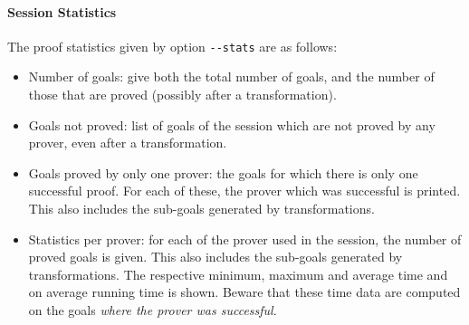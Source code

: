 
\paragraph{Session Statistics}

The proof statistics given by option \verb|--stats| are as follows:
\begin{itemize}
\item Number of goals: give both the total number of goals, and the
  number of those that are proved (possibly after a transformation).
\item Goals not proved: list of goals of the session which are not
  proved by any prover, even after a transformation.
\item Goals proved by only one prover: the goals for which there is only
  one successful proof. For each of these, the prover which was
  successful is printed. This also includes the sub-goals generated by
  transformations.
\item Statistics per prover: for each of the prover used in the
  session, the number of proved goals is given. This also includes the
  sub-goals generated by transformations. The respective minimum,
  maximum and average time and on average running time is
  shown. Beware that these time data are computed on the
  goals \emph{where the prover was successful}.
\end{itemize}

